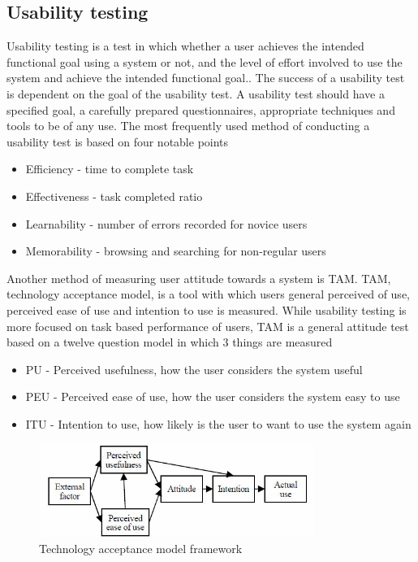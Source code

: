 \clearpage
\subsection{Usability testing}
Usability testing is a test in which whether a user achieves the intended functional goal using a system or not, and the level of effort involved to use the system and achieve the intended functional goal.\cite{iso:9126}. The success of a usability test is dependent on the goal of the usability test. A usability test should have a specified goal, a carefully prepared questionnaires, appropriate techniques and tools to be of any use. The most frequently used method of conducting a usability test is based on four notable points\cite{usability:doc2}\cite{usability:doc3}

\begin{itemize}
\item Efficiency - time to complete task
\item Effectiveness - task completed ratio
\item Learnability - number of errors recorded for novice users
\item Memorability - browsing and searching for non-regular users
\end{itemize}


Another method of measuring user attitude towards a system is TAM.
TAM, technology acceptance model, is a tool with which users general perceived of use, perceived ease of use and intention to use is measured. While usability testing is more focused on  task based performance of users\cite{tam:doc4}, TAM is a general attitude test based on a twelve question model in which 3 things are measured

\begin{itemize}
\item PU - Perceived usefulness, how the user considers the system useful
\item PEU - Perceived ease of use, how the user considers the system easy to use
\item ITU - Intention to use, how likely is the user to want to use the system again
\end{itemize}

\begin{figure}[htb]
	\centering
	\includegraphics[width=0.8\textwidth]{reqspec/tam.png}
	\caption{Technology acceptance model framework\cite{tam:doc4}}
	\label{fig:tam}
\end{figure}


